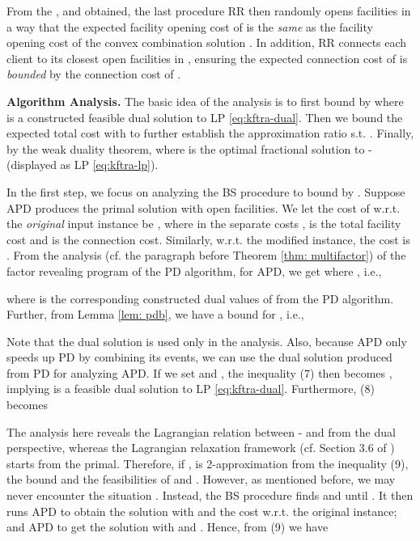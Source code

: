 \documentclass[10pt]{llncs}
\begin{document}
From the ,  and 
obtained, the last procedure RR then randomly opens  facilities
in a way that the expected facility opening cost of 
is the \textit{same} as the facility opening cost of the convex combination
solution . In addition, RR connects each client
 to its closest  open facilities in ,
ensuring the expected connection cost of  is\textit{
bounded} by the connection cost of .

\textbf{Algorithm Analysis. }The basic idea of the analysis is to
first bound 
by 
where 
is a constructed feasible dual solution to LP \eqref{eq:kftra-dual}.
Then we bound the expected total cost 
with  to further
establish the approximation ratio  s.t. .
Finally, by the weak duality theorem, 
where 
is the optimal fractional solution to - (displayed as LP
\eqref{eq:kftra-lp}).

In the first step, we focus on analyzing the BS procedure to bound
 by .
Suppose APD produces the primal solution
 with
 open facilities. We let the cost of 
w.r.t. the \textit{original} input instance be ,
where in the separate costs ,
 is the total
facility cost and 
is the connection cost. Similarly, w.r.t. the modified instance, the
cost is .
From the analysis (cf. the paragraph before Theorem \ref{thm: multifactor})
of the factor revealing program of the PD algorithm, for APD,
we get 
where , i.e.,


 

where 
is the corresponding constructed dual values of 
from the PD algorithm. Further, from Lemma \ref{lem: pdb}, we have
a bound for ,
i.e.,



Note that the dual solution 
is used only in the analysis. Also, because APD only speeds up PD
by combining its events, we can use the dual solution produced from
PD for analyzing APD. If we set 
and ,
the inequality (7) then becomes ,
implying 
is a feasible dual solution to LP \eqref{eq:kftra-dual}. Furthermore,
(8) becomes


The analysis here reveals the Lagrangian relation between -
and  from the dual perspective, whereas the Lagrangian relaxation
framework (cf. Section 3.6 of \cite{jain01approximation}) starts
from the primal. Therefore, if , 
is 2-approximation from the inequality (9), the bound 
and the feasibilities of 
and .
However, as mentioned before, we may never encounter the situation
. Instead, the BS procedure finds 
and  until .
It then runs APD to obtain the solution
 with 
and the cost  w.r.t. the original instance;
and APD to get the solution 
with  and . Hence, from (9)
we have
\end{document}
